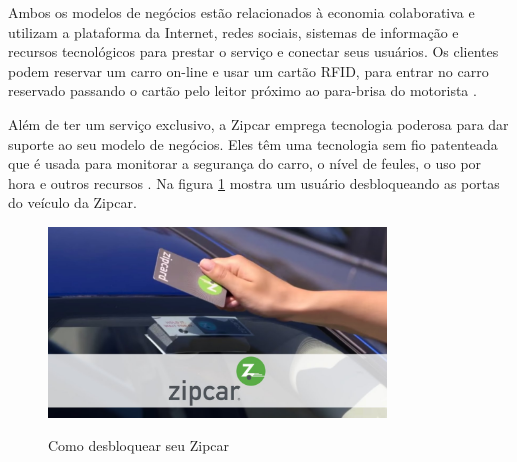 Ambos os modelos de negócios estão relacionados à economia colaborativa e utilizam a plataforma da Internet, redes sociais, sistemas de informação e recursos tecnológicos para prestar o serviço e conectar seus usuários. Os clientes podem reservar um carro on-line e usar um cartão RFID,  para entrar no carro reservado passando o cartão pelo leitor próximo ao para-brisa do motorista \cite{pearlson2009strategic}.

Além de ter um serviço exclusivo, a Zipcar emprega tecnologia poderosa para dar suporte ao seu modelo de negócios. Eles têm uma tecnologia sem fio patenteada que é usada para monitorar a segurança do carro, o nível de feules, o uso por hora e outros recursos \cite{pearlson2009strategic}. 
Na figura \ref{fig:zipcar} mostra um usuário desbloqueando as portas do veículo da Zipcar.


\begin{figure}[!hbtp]
	\centering
	\caption{Como desbloquear seu Zipcar}
	\includegraphics[width=0.8\textwidth]{./04-figuras/zipcar/zipcar.jpg}
	\label{fig:zipcar}
\end{figure}



